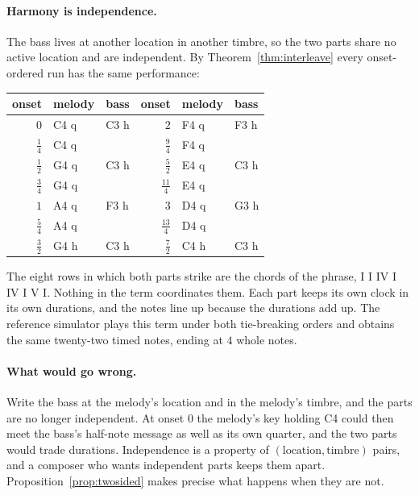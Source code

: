 \documentclass[11pt,a4paper]{article}
\theoremstyle{plain}
\theoremstyle{definition}
\theoremstyle{remark}
\begin{document}
\paragraph{Harmony is independence.} The bass lives at another location in
another timbre, so the two parts share no active location and are independent.
By Theorem~\ref{thm:interleave} every onset-ordered run has the same
performance:
\begin{center}
\small
\begin{tabular}{@{}r@{\quad}ll@{\qquad}r@{\quad}ll@{}}
\toprule
onset & melody & bass & onset & melody & bass \\
\midrule
$0$            & C4 q & C3 h & $2$              & F4 q & F3 h \\
$\tfrac14$     & C4 q &      & $\tfrac94$       & F4 q &      \\
$\tfrac12$     & G4 q & C3 h & $\tfrac52$       & E4 q & C3 h \\
$\tfrac34$     & G4 q &      & $\tfrac{11}4$    & E4 q &      \\
$1$            & A4 q & F3 h & $3$              & D4 q & G3 h \\
$\tfrac54$     & A4 q &      & $\tfrac{13}4$    & D4 q &      \\
$\tfrac32$     & G4 h & C3 h & $\tfrac72$       & C4 h & C3 h \\
\bottomrule
\end{tabular}
\end{center}
The eight rows in which both parts strike are the chords of the phrase, I I IV I
IV I V I. Nothing in the term coordinates them. Each part keeps its own clock in
its own durations, and the notes line up because the durations add up. The
reference simulator plays this term under both tie-breaking orders and obtains
the same twenty-two timed notes, ending at $4$ whole notes.

\paragraph{What would go wrong.} Write the bass at the melody's location and in
the melody's timbre, and the parts are no longer independent. At onset $0$ the
melody's key holding C4 could then meet the bass's half-note message as well as
its own quarter, and the two parts would trade durations. Independence is a
property of $(\text{location},\text{timbre})$ pairs, and a composer who wants
independent parts keeps them apart. Proposition~\ref{prop:twosided} makes
precise what happens when they are not.
\end{document}
